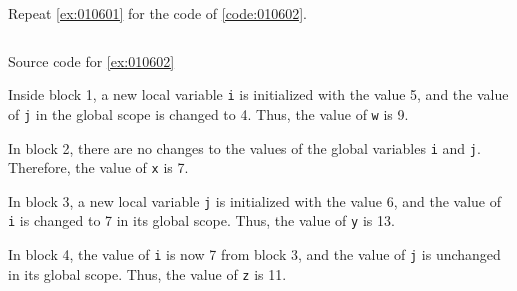 \begin{exercise}\label{ex:010602}
    Repeat \cref{ex:010601} for the code of \cref{code:010602}.
    \begin{listing}[!ht]
    \inputminted[linenos=true,frame=single]{c}{01/06/02/ex010602.c}
    \caption{Source code for \cref{ex:010602}}
    \label{code:010602}
    \end{listing}
\end{exercise}
\begin{solution}\label{sol:010602}
    Inside block 1, a new local variable \texttt{i} is initialized 
    with the value 5, and the value of \texttt{j} in the global scope is changed 
    to 4. Thus, the value of \texttt{w} is 9.

    \noindent In block 2, there are no changes to the values of the global 
    variables \texttt{i} and \texttt{j}. Therefore, the value of \texttt{x} is 7.

    \noindent In block 3, a new local variable \texttt{j} is initialized
    with the value 6, and the value of \texttt{i} is changed to 7 in its global 
    scope. Thus, the value of \texttt{y} is 13.

    \noindent In block 4, the value of \texttt{i} is now 7 from block 3, and the 
    value of \texttt{j} is unchanged in its global scope. Thus, the value of 
    \texttt{z} is 11. 
\end{solution}